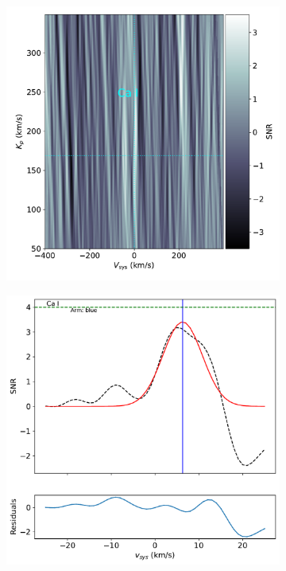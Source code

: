 \documentclass[twocolumn]{aastex631}
\begin{document}
\begin{figure}[ht!]
        \begin{subfigure}[b]{0.333\textwidth}
            \includegraphics[width=\textwidth]{plots-updated/kp-vsys-map/blue/KELT-20b.20190504.blue.Ca.CCFs-shifted.pdf}
            \label{fig:2d-ccf-Ca-combined}
        \end{subfigure}
        \begin{subfigure}[b]{0.333\textwidth}
            \includegraphics[width=\textwidth]{plots-updated/line-profile/blue/KELT-20b.20190504.blue.Ca.SNR-Gaussian.pdf}
            \label{fig:1d-ccf-Ca-combined}
        \end{subfigure}


\end{figure}
\end{document}
